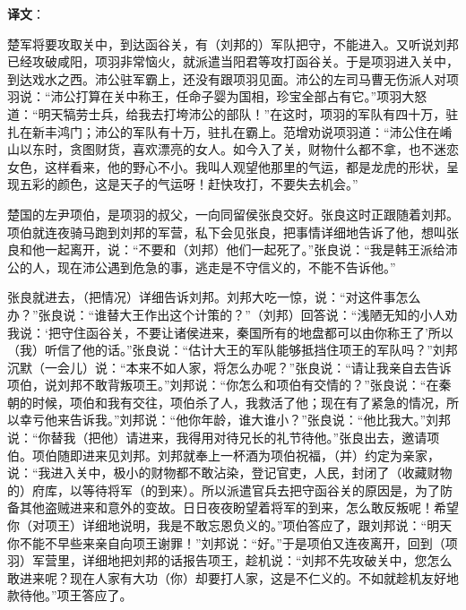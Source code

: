 \documentclass[12pt,UTF-8,openany]{ctexbook}
\begin{document}
\newpage

\textbf{译文}：

\vspace{1em}

\begin{normalsize}
    
    楚军将要攻取关中，到达函谷关，有（刘邦的）军队把守，不能进入。又听说刘邦已经攻破咸阳，项羽非常恼火，就派遣当阳君等攻打函谷关。于是项羽进入关中，到达戏水之西。沛公驻军霸上，还没有跟项羽见面。沛公的左司马曹无伤派人对项羽说：“沛公打算在关中称王，任命子婴为国相，珍宝全部占有它。”项羽大怒道：“明天犒劳士兵，给我去打垮沛公的部队！”在这时，项羽的军队有四十万，驻扎在新丰鸿门；沛公的军队有十万，驻扎在霸上。范增劝说项羽道：“沛公住在崤山以东时，贪图财货，喜欢漂亮的女人。如今入了关，财物什么都不拿，也不迷恋女色，这样看来，他的野心不小。我叫人观望他那里的气运，都是龙虎的形状，呈现五彩的颜色，这是天子的气运呀！赶快攻打，不要失去机会。”
    
    楚国的左尹项伯，是项羽的叔父，一向同留侯张良交好。张良这时正跟随着刘邦。项伯就连夜骑马跑到刘邦的军营，私下会见张良，把事情详细地告诉了他，想叫张良和他一起离开，说：“不要和（刘邦）他们一起死了。”张良说：“我是韩王派给沛公的人，现在沛公遇到危急的事，逃走是不守信义的，不能不告诉他。”
    
    张良就进去，（把情况）详细告诉刘邦。刘邦大吃一惊，说：“对这件事怎么办？”张良说：“谁替大王作出这个计策的？”（刘邦）回答说：“浅陋无知的小人劝我说：‘把守住函谷关，不要让诸侯进来，秦国所有的地盘都可以由你称王了’所以（我）听信了他的话。”张良说：“估计大王的军队能够抵挡住项王的军队吗？”刘邦沉默（一会儿）说：“本来不如人家，将怎么办呢？”张良说：“请让我亲自去告诉项伯，说刘邦不敢背叛项王。”刘邦说：“你怎么和项伯有交情的？”张良说：“在秦朝的时候，项伯和我有交往，项伯杀了人，我救活了他；现在有了紧急的情况，所以幸亏他来告诉我。”刘邦说：“他你年龄，谁大谁小？”张良说：“他比我大。”刘邦说：“你替我（把他）请进来，我得用对待兄长的礼节待他。”张良出去，邀请项伯。项伯随即进来见刘邦。刘邦就奉上一杯酒为项伯祝福，（并）约定为亲家，说：“我进入关中，极小的财物都不敢沾染，登记官吏，人民，封闭了（收藏财物的）府库，以等待将军（的到来）。所以派遣官兵去把守函谷关的原因是，为了防备其他盗贼进来和意外的变故。日日夜夜盼望着将军的到来，怎么敢反叛呢！希望你（对项王）详细地说明，我是不敢忘恩负义的。”项伯答应了，跟刘邦说：“明天你不能不早些来亲自向项王谢罪！”刘邦说：“好。”于是项伯又连夜离开，回到（项羽）军营里，详细地把刘邦的话报告项王，趁机说：“刘邦不先攻破关中，您怎么敢进来呢？现在人家有大功（你）却要打人家，这是不仁义的。不如就趁机友好地款待他。”项王答应了。
    

\end{normalsize}
\end{document}
